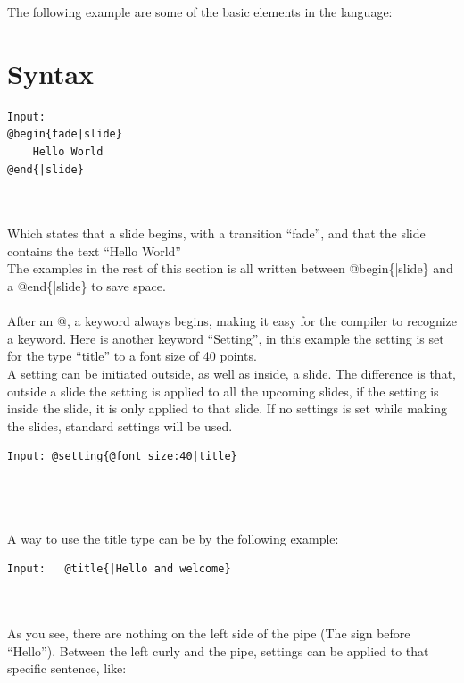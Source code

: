 The following example are some of the basic elements in the language:

\section{Syntax}

\begin{verbatim}
Input:
@begin{fade|slide}
    Hello World
@end{|slide}
\end{verbatim}

\\ \\
Which states that a slide begins, with a transition ``fade'', and that the slide contains the text ``Hello World'' \\
The examples in the rest of this section is all written between @begin\{|slide\} and a @end\{|slide\} to save space.
\\ \\
After an @, a keyword always begins, making it easy for the compiler to recognize a keyword.
Here is another keyword ``Setting'', in this example the setting is set for the type ``title'' to a font size of 40 points. \\
A setting can be initiated outside, as well as inside, a slide. The difference is that, outside a slide the setting is applied to all the upcoming slides, if the setting is inside the slide, it is only applied to that slide. If no settings is set while making the slides, standard settings will be used.

\begin{verbatim}
Input: @setting{@font_size:40|title}
\end{verbatim}

 \\
\\ \\
A way to use the title type can be by the following example:\\

\begin{verbatim}
Input:   @title{|Hello and welcome}
\end{verbatim}

\\ \\
As you see, there are nothing on the left side of the pipe (The sign before ``Hello''). Between the left curly and the pipe, settings can be applied to that specific sentence, like:\\

